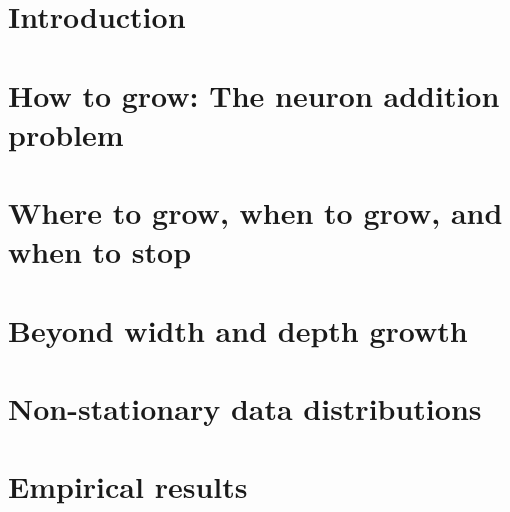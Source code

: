 \documentclass[a4paper]{article}
\theoremstyle{thmstyleone}%
\theoremstyle{thmstyletwo}%
\theoremstyle{thmstylethree}%
\numberwithin{equation}{section}
\begin{document}

\maketitle



\section{Introduction}



\section{How to grow: The neuron addition problem}\label{sec:neuron_addition_problem}



\section{Where to grow, when to grow, and when to stop}\label{sec:where_when}



\section{Beyond width and depth growth}\label{sec:beyond_width_depth}



\section{Non-stationary data distributions}\label{sec:non_stationary}



\section{Empirical results}\label{sec:results}
\end{document}
